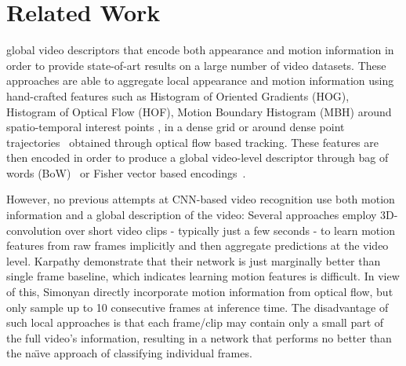 \documentclass[10pt,twocolumn,letterpaper]{article}
\begin{document}
%
\vspace{-.8em}\section{Related Work}\vspace{-1em}\label{sec:related}%
global video descriptors that encode both appearance and motion information in order to
 provide state-of-art results on a large number of video datasets. These approaches are able
to aggregate local appearance and motion information using hand-crafted features
such as Histogram of Oriented Gradients (HOG), Histogram of Optical
Flow (HOF), Motion Boundary Histogram (MBH) around spatio-temporal
interest points \cite{laptev-actions}, in a dense grid
\cite{Wang09evaluationof} or around dense point
trajectories~\cite{jain13,kuehne11,wang11,wang13} obtained through
optical flow based tracking. These features are then encoded in order
to produce a global video-level descriptor through bag of words
(BoW)~\cite{laptev-actions} or Fisher vector based
encodings~\cite{wang13}.

However, no previous attempts at CNN-based video recognition use both
motion information and a global description of the video: Several
approaches \cite{liris2011,ji2013,karpathy2014large} employ
3D-convolution over short video clips - typically just a few seconds -
to learn motion features from raw frames implicitly
and then aggregate predictions at the video level.
Karpathy \etal\cite{karpathy2014large} demonstrate that their network
is just marginally better than single frame baseline, which indicates
learning motion features is difficult.
In view of this, Simonyan
\etal\cite{simonyan2014two} directly incorporate motion information
from optical flow, but only sample up to 10 consecutive frames at
inference time. The disadvantage of such local approaches is that each
frame/clip may contain only a small part of the full video's
information, resulting in a network that performs no better than the
na\"{\i}ve approach of classifying individual frames.
\end{document}

